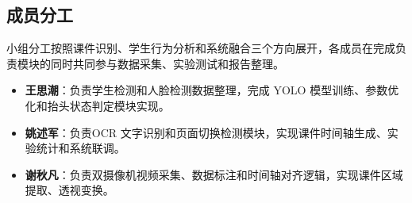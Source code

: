 \documentclass[12pt,hyperref,a4paper,UTF8]{ctexart}
\begin{document}
\subsection{成员分工}

小组分工按照课件识别、学生行为分析和系统融合三个方向展开，各成员在完成负责模块的同时共同参与数据采集、实验测试和报告整理。

\begin{itemize}
    \item \textbf{王思潮}：负责学生检测和人脸检测数据整理，完成 YOLO 模型训练、参数优化和抬头状态判定模块实现。
    \item \textbf{姚述军}：负责OCR 文字识别和页面切换检测模块，实现课件时间轴生成、实验统计和系统联调。
    \item \textbf{谢秋凡}：负责双摄像机视频采集、数据标注和时间轴对齐逻辑，实现课件区域提取、透视变换。
\end{itemize}
\end{document}
